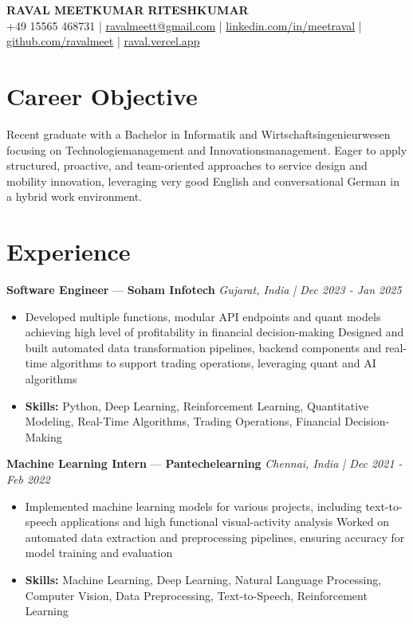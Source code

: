 \documentclass[a4paper,10pt]{article}
\begin{document}
\begin{center}
  {\Large\bfseries RAVAL MEETKUMAR RITESHKUMAR}\\[2pt]
  {\small +49 15565 468731 \;|\; \href{mailto:ravalmeett@gmail.com}{ravalmeett@gmail.com} \;|\; \href{https://www.linkedin.com/in/meetraval/}{linkedin.com/in/meetraval} \;|\; \href{https://github.com/ravalmeet}{github.com/ravalmeet} \;|\; \href{https://raval.vercel.app/}{raval.vercel.app}}
\end{center}
\vspace{-3pt}

\section*{Career Objective}
Recent graduate with a Bachelor in Informatik and Wirtschaftsingenieurwesen focusing on Technologiemanagement and Innovationsmanagement. Eager to apply structured, proactive, and team-oriented approaches to service design and mobility innovation, leveraging very good English and conversational German in a hybrid work environment.\par

\section*{Experience}
\textbf{Software Engineer} — \textbf{Soham Infotech} \hfill \textit{Gujarat, India \;|\; Dec 2023 - Jan 2025}\par
\vspace{1pt}
\begin{itemize}
  \item Developed multiple functions, modular API endpoints and quant models achieving high level of profitability in financial decision-making Designed and built automated data transformation pipelines, backend components and real-time algorithms to support trading operations, leveraging quant and AI algorithms
  \item \textbf{Skills:} Python, Deep Learning, Reinforcement Learning, Quantitative Modeling, Real-Time Algorithms, Trading Operations, Financial Decision-Making
\end{itemize}
\vspace{3pt}
\textbf{Machine Learning Intern} — \textbf{Pantechelearning} \hfill \textit{Chennai, India \;|\; Dec 2021 - Feb 2022}\par
\vspace{1pt}
\begin{itemize}
  \item Implemented machine learning models for various projects, including text-to-speech applications and high functional visual-activity analysis Worked on automated data extraction and preprocessing pipelines, ensuring accuracy for model training and evaluation
  \item \textbf{Skills:} Machine Learning, Deep Learning, Natural Language Processing, Computer Vision, Data Preprocessing, Text-to-Speech, Reinforcement Learning
\end{itemize}
\end{document}
